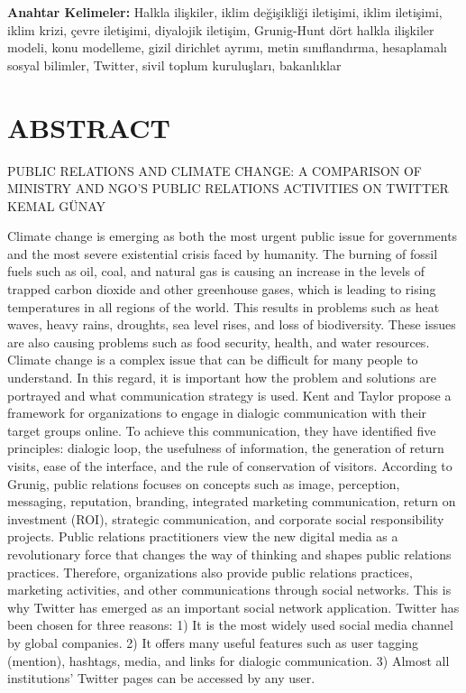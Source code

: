 \documentclass[
]{book}
\begin{document}
\textbf{Anahtar Kelimeler:} Halkla ilişkiler, iklim değişikliği iletişimi, iklim iletişimi, iklim krizi, çevre iletişimi, diyalojik iletişim, Grunig-Hunt dört halkla ilişkiler modeli, konu modelleme, gizil dirichlet ayrımı, metin sınıflandırma, hesaplamalı sosyal bilimler, Twitter, sivil toplum kuruluşları, bakanlıklar

\hypertarget{abstract}{%
\chapter*{ABSTRACT}\label{abstract}}

PUBLIC RELATIONS AND CLIMATE CHANGE: A COMPARISON OF MINISTRY AND NGO'S PUBLIC RELATIONS ACTIVITIES ON TWITTER
KEMAL GÜNAY

Climate change is emerging as both the most urgent public issue for governments and the most severe existential crisis faced by humanity. The burning of fossil fuels such as oil, coal, and natural gas is causing an increase in the levels of trapped carbon dioxide and other greenhouse gases, which is leading to rising temperatures in all regions of the world. This results in problems such as heat waves, heavy rains, droughts, sea level rises, and loss of biodiversity. These issues are also causing problems such as food security, health, and water resources.
Climate change is a complex issue that can be difficult for many people to understand. In this regard, it is important how the problem and solutions are portrayed and what communication strategy is used. Kent and Taylor propose a framework for organizations to engage in dialogic communication with their target groups online. To achieve this communication, they have identified five principles: dialogic loop, the usefulness of information, the generation of return visits, ease of the interface, and the rule of conservation of visitors.
According to Grunig, public relations focuses on concepts such as image, perception, messaging, reputation, branding, integrated marketing communication, return on investment (ROI), strategic communication, and corporate social responsibility projects. Public relations practitioners view the new digital media as a revolutionary force that changes the way of thinking and shapes public relations practices. Therefore, organizations also provide public relations practices, marketing activities, and other communications through social networks. This is why Twitter has emerged as an important social network application.
Twitter has been chosen for three reasons: 1) It is the most widely used social media channel by global companies. 2) It offers many useful features such as user tagging (mention), hashtags, media, and links for dialogic communication. 3) Almost all institutions' Twitter pages can be accessed by any user.
\end{document}
